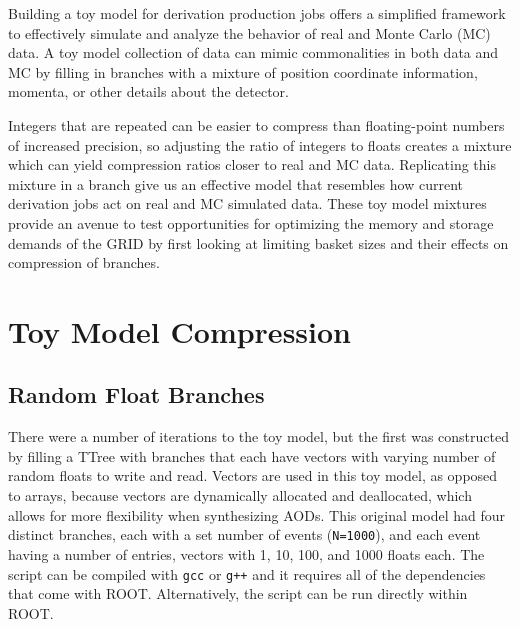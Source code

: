 Building a toy model for derivation production jobs offers a simplified framework to effectively simulate and analyze the behavior of real and Monte Carlo (MC) data.
A toy model collection of data can mimic commonalities in both data and MC by filling in branches with a mixture of position coordinate information, momenta, or other details about the detector.  

Integers that are repeated can be easier to compress than floating-point numbers of increased precision, so adjusting the ratio of integers to floats creates a mixture which can yield compression ratios closer to real and MC data.  
Replicating this mixture in a branch give us an effective model that resembles how current derivation jobs act on real and MC simulated data. 
These toy model mixtures provide an avenue to test opportunities for optimizing the memory and storage demands of the GRID by first looking at limiting basket sizes and their effects on compression of branches. 


\section{Toy Model Compression}

\subsection{Random Float Branches} \label{sec:toy_compression_random_float_branches}
There were a number of iterations to the toy model, but the first was constructed by filling a TTree with branches that each have vectors with varying number of random floats to write and read.
Vectors are used in this toy model, as opposed to arrays, because vectors are dynamically allocated and deallocated, which allows for more flexibility when synthesizing AODs. 
This original model had four distinct branches, each with a set number of events (\verb|N=1000|), and each event having a number of entries, vectors with 1, 10, 100, and 1000 floats each.
The script can be compiled with \verb|gcc| or \verb|g++| and it requires all of the dependencies that come with ROOT. 
Alternatively, the script can be run directly within ROOT.

